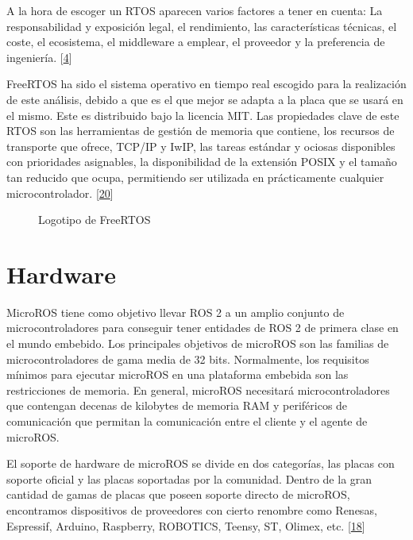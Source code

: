 \documentclass[a4paper,11pt,spanish]{sphinxmanual}
\let\sphinxpxdimen\pdfpxdimen\else\newdimen\sphinxpxdimen
\begin{document}
\sphinxAtStartPar
A la hora de escoger un RTOS aparecen varios factores a tener en cuenta:
La responsabilidad y exposición legal, el rendimiento, las características
técnicas, el coste, el ecosistema, el middleware a emplear, el proveedor
y la preferencia de ingeniería. {[}\hyperlink{cite.marco_teorico_y_estado_del_arte:id28}{4}{]}

\sphinxAtStartPar
FreeRTOS ha sido el sistema operativo en tiempo real escogido para la
realización de este análisis, debido a que es el que mejor se adapta a la placa
que se usará en el mismo. Este es distribuido bajo la licencia MIT. Las
propiedades clave de este RTOS son las herramientas de gestión de memoria
que contiene, los recursos de transporte que ofrece, TCP/IP y IwIP, las tareas
estándar y ociosas disponibles con prioridades asignables, la disponibilidad
de la extensión POSIX y el tamaño tan reducido que ocupa, permitiendo ser
utilizada en prácticamente cualquier microcontrolador. {[}\hyperlink{cite.marco_teorico_y_estado_del_arte:id29}{20}{]}

\begin{figure}[htbp]
\centering
\capstart

\noindent\sphinxincludegraphics[width=200\sphinxpxdimen]{{freertos}.jpeg}
\caption{Logotipo de FreeRTOS}\label{\detokenize{software:id29}}\end{figure}


\chapter{Hardware}
\label{\detokenize{hardware:hardware}}\label{\detokenize{hardware::doc}}
\sphinxAtStartPar
Micro\sphinxhyphen{}ROS tiene como objetivo llevar ROS 2 a un amplio conjunto
de microcontroladores para conseguir tener entidades de ROS 2 de
primera clase en el mundo embebido. Los principales objetivos de
micro\sphinxhyphen{}ROS son las familias de microcontroladores de gama media de 32 bits.
Normalmente, los requisitos mínimos para ejecutar micro\sphinxhyphen{}ROS en una
plataforma embebida son las restricciones de memoria. En general, micro\sphinxhyphen{}ROS
necesitará microcontroladores que contengan decenas de kilobytes de memoria
RAM y periféricos de comunicación que permitan la comunicación entre el
cliente y el agente de micro\sphinxhyphen{}ROS.

\sphinxAtStartPar
El soporte de hardware de micro\sphinxhyphen{}ROS se divide en dos categorías,
las placas con soporte oficial y las placas soportadas por la comunidad.
Dentro de la gran cantidad de gamas de placas que poseen soporte directo
de micro\sphinxhyphen{}ROS, encontramos dispositivos de proveedores con cierto renombre
como Renesas, Espressif, Arduino, Raspberry, ROBOTICS, Teensy, ST, Olimex,
etc. {[}\hyperlink{cite.marco_teorico_y_estado_del_arte:id30}{18}{]}
\end{document}
